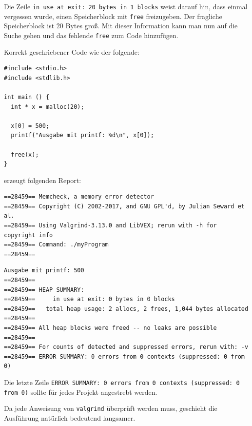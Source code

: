 Die Zeile \texttt{in use at exit: 20 bytes in 1 blocks} weist darauf hin, dass einmal vergessen wurde, einen Speicherblock mit \texttt{free} freizugeben. Der fragliche Speicherblock ist 20 Bytes groß. Mit dieser Information kann man nun auf die Suche gehen und das fehlende \texttt{free} zum Code hinzufügen.

Korrekt geschriebener Code wie der folgende:

\begin{codebox}
\begin{verbatim}
#include <stdio.h>
#include <stdlib.h>

int main () {
  int * x = malloc(20);

  x[0] = 500;
  printf("Ausgabe mit printf: %d\n", x[0]);

  free(x);
}
\end{verbatim}
\end{codebox}

erzeugt folgenden Report:

\begin{cmdbox}
\begin{verbatim}
==28459== Memcheck, a memory error detector
==28459== Copyright (C) 2002-2017, and GNU GPL'd, by Julian Seward et al.
==28459== Using Valgrind-3.13.0 and LibVEX; rerun with -h for copyright info
==28459== Command: ./myProgram
==28459==
\end{verbatim}
\end{cmdbox}

\begin{cmdbox}[]
\begin{verbatim}
Ausgabe mit printf: 500
==28459==
==28459== HEAP SUMMARY:
==28459==     in use at exit: 0 bytes in 0 blocks
==28459==   total heap usage: 2 allocs, 2 frees, 1,044 bytes allocated
==28459==
==28459== All heap blocks were freed -- no leaks are possible
==28459==
==28459== For counts of detected and suppressed errors, rerun with: -v
==28459== ERROR SUMMARY: 0 errors from 0 contexts (suppressed: 0 from 0)
\end{verbatim}
\end{cmdbox}

Die letzte Zeile \texttt{ERROR SUMMARY: 0 errors from 0 contexts (suppressed: 0 from 0)} sollte für jedes Projekt angestrebt werden.

Da jede Anweisung von \texttt{valgrind} überprüft werden muss, geschieht die Ausführung natürlich bedeutend langsamer.

